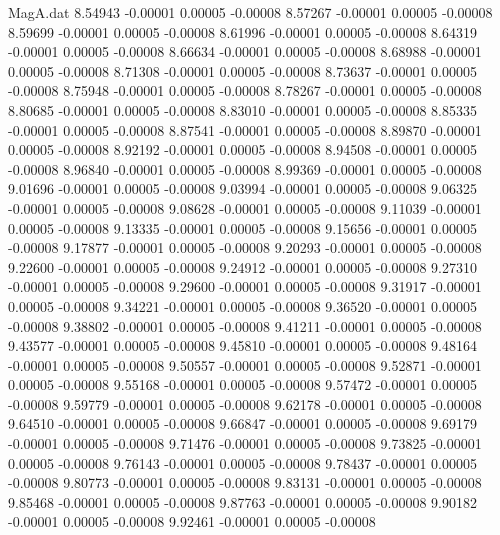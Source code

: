 \begin{filecontents}{MagA.dat}
   8.54943   -0.00001    0.00005   -0.00008
   8.57267   -0.00001    0.00005   -0.00008
   8.59699   -0.00001    0.00005   -0.00008
   8.61996   -0.00001    0.00005   -0.00008
   8.64319   -0.00001    0.00005   -0.00008
   8.66634   -0.00001    0.00005   -0.00008
   8.68988   -0.00001    0.00005   -0.00008
   8.71308   -0.00001    0.00005   -0.00008
   8.73637   -0.00001    0.00005   -0.00008
   8.75948   -0.00001    0.00005   -0.00008
   8.78267   -0.00001    0.00005   -0.00008
   8.80685   -0.00001    0.00005   -0.00008
   8.83010   -0.00001    0.00005   -0.00008
   8.85335   -0.00001    0.00005   -0.00008
   8.87541   -0.00001    0.00005   -0.00008
   8.89870   -0.00001    0.00005   -0.00008
   8.92192   -0.00001    0.00005   -0.00008
   8.94508   -0.00001    0.00005   -0.00008
   8.96840   -0.00001    0.00005   -0.00008
   8.99369   -0.00001    0.00005   -0.00008
   9.01696   -0.00001    0.00005   -0.00008
   9.03994   -0.00001    0.00005   -0.00008
   9.06325   -0.00001    0.00005   -0.00008
   9.08628   -0.00001    0.00005   -0.00008
   9.11039   -0.00001    0.00005   -0.00008
   9.13335   -0.00001    0.00005   -0.00008
   9.15656   -0.00001    0.00005   -0.00008
   9.17877   -0.00001    0.00005   -0.00008
   9.20293   -0.00001    0.00005   -0.00008
   9.22600   -0.00001    0.00005   -0.00008
   9.24912   -0.00001    0.00005   -0.00008
   9.27310   -0.00001    0.00005   -0.00008
   9.29600   -0.00001    0.00005   -0.00008
   9.31917   -0.00001    0.00005   -0.00008
   9.34221   -0.00001    0.00005   -0.00008
   9.36520   -0.00001    0.00005   -0.00008
   9.38802   -0.00001    0.00005   -0.00008
   9.41211   -0.00001    0.00005   -0.00008
   9.43577   -0.00001    0.00005   -0.00008
   9.45810   -0.00001    0.00005   -0.00008
   9.48164   -0.00001    0.00005   -0.00008
   9.50557   -0.00001    0.00005   -0.00008
   9.52871   -0.00001    0.00005   -0.00008
   9.55168   -0.00001    0.00005   -0.00008
   9.57472   -0.00001    0.00005   -0.00008
   9.59779   -0.00001    0.00005   -0.00008
   9.62178   -0.00001    0.00005   -0.00008
   9.64510   -0.00001    0.00005   -0.00008
   9.66847   -0.00001    0.00005   -0.00008
   9.69179   -0.00001    0.00005   -0.00008
   9.71476   -0.00001    0.00005   -0.00008
   9.73825   -0.00001    0.00005   -0.00008
   9.76143   -0.00001    0.00005   -0.00008
   9.78437   -0.00001    0.00005   -0.00008
   9.80773   -0.00001    0.00005   -0.00008
   9.83131   -0.00001    0.00005   -0.00008
   9.85468   -0.00001    0.00005   -0.00008
   9.87763   -0.00001    0.00005   -0.00008
   9.90182   -0.00001    0.00005   -0.00008
   9.92461   -0.00001    0.00005   -0.00008

\end{filecontents}
